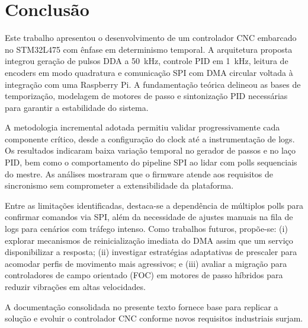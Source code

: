 \chapter{Conclusão}\label{cap:conclusao}

Este trabalho apresentou o desenvolvimento de um controlador CNC
embarcado no STM32L475 com ênfase em determinismo temporal. A
arquitetura proposta integrou geração de pulsos DDA a
\SI{50}{\kilo\hertz}, controle PID em \SI{1}{\kilo\hertz}, leitura de
encoders em modo quadratura e comunicação SPI com DMA circular voltada à
integração com uma Raspberry Pi. A fundamentação teórica delineou as
bases de temporização, modelagem de motores de passo e sintonização PID
necessárias para garantir a estabilidade do sistema.

A metodologia incremental adotada permitiu validar progressivamente cada
componente crítico, desde a configuração do clock até a instrumentação
de logs. Os resultados indicaram baixa variação temporal no gerador de
passos e no laço PID, bem como o comportamento do pipeline SPI ao lidar
com polls
sequenciais do mestre. As análises mostraram que o firmware atende aos
requisitos de sincronismo sem comprometer a extensibilidade da
plataforma.

Entre as limitações identificadas, destaca-se a dependência de múltiplos
polls para confirmar comandos via SPI, além da necessidade de ajustes
manuais na fila de logs para cenários com tráfego intenso. Como trabalhos
futuros, propõe-se: (i) explorar mecanismos de reinicialização imediata
do DMA assim que um serviço disponibilizar a resposta; (ii) investigar
estratégias adaptativas de prescaler para acomodar perfis de movimento
mais agressivos; e (iii) avaliar a migração para controladores de campo
orientado (FOC) em motores de passo híbridos para reduzir vibrações em
altas velocidades.

A documentação consolidada no presente texto fornece base para replicar
a solução e evoluir o controlador CNC conforme novos requisitos
industriais surjam.
